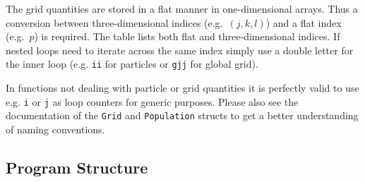 \documentclass[10pt,a4paper]{article}
\begin{document}
The grid quantities are stored in a flat manner in one-dimensional arrays. Thus a conversion between three-dimensional indices (e.g.\ $(j,k,l)$) and a flat index (e.g.\ $p$) is required. The table lists both flat and three-dimensional indices. If nested loops need to iterate across the same index simply use a double letter for the inner loop (e.g. \lstinline$ii$ for particles or \lstinline$gjj$ for global grid).

In functions not dealing with particle or grid quantities it is perfectly valid to use e.g. \lstinline$i$ or \lstinline$j$ as loop counters for generic purposes. Please also see the documentation of the \lstinline$Grid$ and \lstinline$Population$ structs to get a better understanding of naming conventions.



\subsection{Program Structure}
\end{document}
